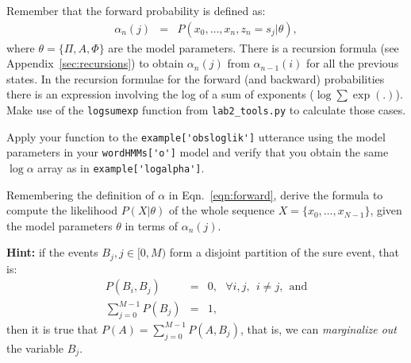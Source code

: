 \documentclass{nada-ten}
\begin{document}
Remember that the forward probability is defined as:
\begin{eqnarray}
  \alpha_n(j) &=& P(x_0, \dots, x_n, z_n=s_j|\theta), \label{eqn:forward}
\end{eqnarray}
where $\theta = \{\Pi, A, \Phi\}$ are the model parameters. 
There is a recursion formula (see Appendix~\ref{sec:recursions}) to obtain $\alpha_n(j)$ from $\alpha_{n-1}(i)$ for all the previous states.
In the recursion formulae for the forward (and backward) probabilities there is an expression involving the log of a sum of exponents ($\log\sum\exp(.)$). Make use of the \texttt{logsumexp} function from \texttt{lab2\_tools.py} to calculate those cases.

Apply your function to the \verb|example['obsloglik']| utterance using the model parameters in your \verb|wordHMMs['o']| model and verify that you obtain the same $\log\alpha$ array as in \verb|example['logalpha']|.

Remembering the definition of $\alpha$ in Eqn.~\ref{eqn:forward}, derive the formula to compute the likelihood $P(X|\theta)$ of the whole sequence $X = \{x_0, \dots, x_{N-1}\}$, given the model parameters $\theta$ in terms of $\alpha_n(j)$.

\begin{mdframed}
\textbf{Hint:} if the events $B_j, j\in[0, M)$ form a disjoint partition of the sure event, that is:
\begin{eqnarray*}
  P(B_i,B_j)&=&0,\ \ \  \forall i,j,\ \ i\neq j,\ \ \mbox{and} \\
  \sum_{j=0}^{M-1}P(B_j)&=&1,
\end{eqnarray*}
then it is true that $P(A) = \sum_{j=0}^{M-1} P(A,B_j)$, that is, we can \emph{marginalize out} the variable $B_j$.
\end{mdframed}

\end{document}

